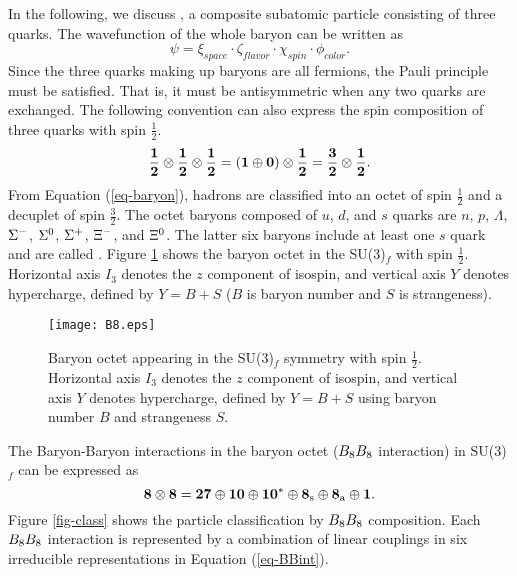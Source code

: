 In the following, we discuss , a composite subatomic particle consisting of three quarks. The wavefunction of the whole baryon can be written as
\begin{equation}
  \psi = \xi_{space} \cdot \zeta_{flavor} \cdot \chi_{spin} \cdot \phi_{color}.
\end{equation}
Since the three quarks making up baryons are all fermions, the Pauli principle must be satisfied. That is, it must be antisymmetric when any two quarks are exchanged.  The following convention can also express the spin composition of three quarks with spin $\frac{1}{2}$.
\begin{equation}
    {\bf \frac{1}{2}\otimes\frac{1}{2}\otimes\frac{1}{2}=(1\oplus0)\otimes\frac{1}{2}=\frac{3}{2}\otimes\frac{1}{2}}.
    \label{eq-baryon}
\end{equation}
From Equation (\ref{eq-baryon}), hadrons are classified into an octet of spin $\frac{1}{2}$ and a decuplet of spin $\frac{3}{2}$. The octet baryons composed of $u$, $d$, and $s$ quarks are $n$, $p$, $\Lambda$, $\Sigma^{-}$, $\Sigma^{0}$, $\Sigma^{+}$, $\Xi^{-}$, and $\Xi^{0}$. The latter six baryons include at least one $s$ quark and are called . Figure \ref{fig-B8} shows the baryon octet in the SU(3)$_f$ with spin $\frac{1}{2}$. Horizontal axis $I_{3}$ denotes the $z$ component of isospin, and vertical axis $Y$ denotes hypercharge, defined by $Y = B + S$ ($B$ is baryon number and $S$ is strangeness). 
\begin{figure}[h]
  \begin{center}
  \texttt{[image: B8.eps]}
  \caption{Baryon octet appearing in the SU(3)$_f$ symmetry with spin $\frac{1}{2}$. Horizontal axis $I_{3}$ denotes the $z$ component of isospin, and vertical axis $Y$ denotes hypercharge, defined by $Y = B + S$ using baryon number $B$ and strangeness $S$.}
  \label{fig-B8}
  \end{center}
\end{figure}

The Baryon-Baryon interactions in the baryon octet ($B_{8}B_{8}$ interaction) in SU(3)$_f$ can be expressed as
\begin{equation}
  {\bf 8\otimes 8 = 27\oplus 10\oplus 10^*\oplus 8_{\rm{s}}\oplus 8_{\rm{a}}\oplus 1}. 
  \label{eq-BBint}
\end{equation}
Figure \ref{fig-class} shows the particle classification by $B_{8}B_{8}$ composition. Each $B_{8}B_{8}$ interaction is represented by a combination of linear couplings in six irreducible representations in Equation (\ref{eq-BBint}).

